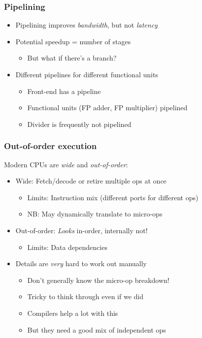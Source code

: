 \documentclass{beamer}
\begin{document}
\begin{frame}
  \frametitle{Pipelining}
  
  \begin{itemize}
  \item Pipelining improves {\em bandwidth}, but not {\em latency}
  \item Potential speedup = number of stages
    \begin{itemize}
    \item But what if there's a branch?
    \end{itemize}
  \item Different pipelines for different functional units
    \begin{itemize}
    \item Front-end has a pipeline
    \item Functional units (FP adder, FP multiplier) pipelined
    \item Divider is frequently not pipelined
    \end{itemize}
  \end{itemize}
\end{frame}



\begin{frame}
  \frametitle{Out-of-order execution}

  Modern CPUs are {\em wide} and {\em out-of-order}:
  \begin{itemize}
  \item Wide: Fetch/decode or retire multiple ops at once
    \begin{itemize}
    \item Limits: Instruction mix (different ports for different ops)
    \item NB: May dynamically translate to micro-ops
    \end{itemize}
  \item Out-of-order: {\em Looks} in-order, internally not!
    \begin{itemize}
    \item Limits: Data dependencies
    \end{itemize}
  \item Details are {\em very} hard to work out manually
    \begin{itemize}
    \item Don't generally know the micro-op breakdown!
    \item Tricky to think through even if we did
    \item Compilers help a lot with this
    \item But they need a good mix of independent ops
    \end{itemize}
  \end{itemize}
\end{frame}
\end{document}

